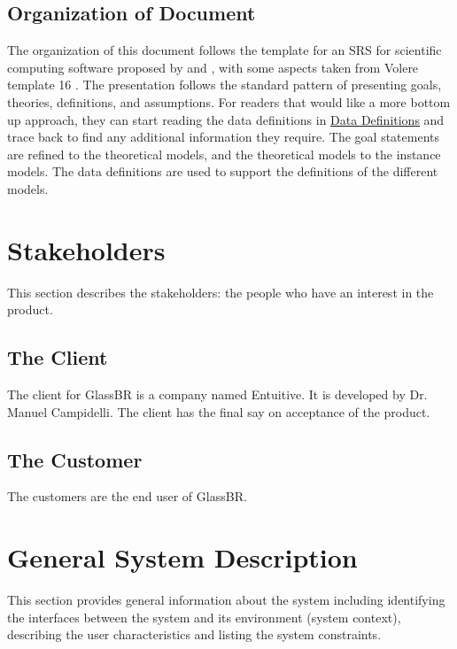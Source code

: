 \documentclass[12pt]{article}
\begin{document}
\subsection{Organization of Document}
\label{Sec:DocOrg}
The organization of this document follows the template for an SRS for scientific computing software proposed by \cite{koothoor2013} and \cite{smithLai2005}, with some aspects taken from Volere template 16 \cite{rbrtsn2012}. The presentation follows the standard pattern of presenting goals, theories, definitions, and assumptions. For readers that would like a more bottom up approach, they can start reading the data definitions in \hyperref[Sec:DDs]{Data Definitions} and trace back to find any additional information they require.
The goal statements are refined to the theoretical models, and the theoretical models to the instance models. The data definitions are used to support the definitions of the different models.
\section{Stakeholders}
\label{Sec:Stakeholder}
This section describes the stakeholders: the people who have an interest in the product.
\subsection{The Client}
\label{Sec:Client}
The client for GlassBR is a company named Entuitive. It is developed by Dr. Manuel Campidelli. The client has the final say on acceptance of the product.
\subsection{The Customer}
\label{Sec:Customer}
The customers are the end user of GlassBR.
\section{General System Description}
\label{Sec:GenSysDesc}
This section provides general information about the system including identifying the interfaces between the system and its environment (system context), describing the user characteristics and listing the system constraints.
\end{document}
